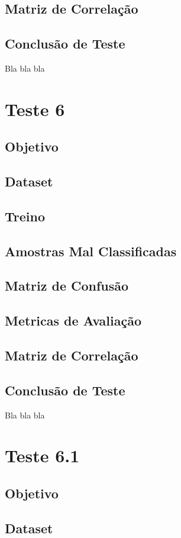 \subsection{Matriz de Correlação}
\subsection{Conclusão de Teste}
    Bla bla bla


\section{Teste 6}
\subsection{Objetivo}
\subsection{Dataset}
\subsection{Treino}
\subsection{Amostras Mal Classificadas}
\subsection{Matriz de Confusão}
\subsection{Metricas de Avaliação}
\subsection{Matriz de Correlação}
\subsection{Conclusão de Teste}
    Bla bla bla


\section{Teste 6.1}
\subsection{Objetivo}
\subsection{Dataset}
